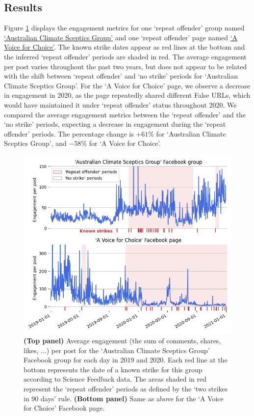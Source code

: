 \documentclass[review]{elsarticle}
\begin{document}
\subsection{Results}

Figure \ref{repeat_example_timeseries} displays the engagement metrics for one `repeat offender' group named \href{https://www.facebook.com/groups/108655705888371/}{`Australian Climate Sceptics Group'} and one `repeat offender' page named \href{https://www.facebook.com/avoiceforchoice/}{`A Voice for Choice'}.
The known strike dates appear as red lines at the bottom and the inferred ‘repeat offender’ periods are shaded in red.
The average engagement per post varies throughout the past two years, but does not appear to be related with the shift between `repeat offender' and `no strike' periods for `Australian Climate Sceptics Group'.
For the `A Voice for Choice' page, we observe a decrease in engagement in 2020, as the page repeatedly shared different False URLs, which would have maintained it under `repeat offender' status throughout 2020.
We compared the average engagement metrics between the `repeat offender' and the `no strike' periods, expecting a decrease in engagement during the `repeat offender' periods.
The percentage change is $+61\%$ for `Australian Climate Sceptics Group', and $-58\%$ for `A Voice for Choice'.

\begin{figure}[!h]
\centering
\includegraphics[scale=0.5]{./../figure/sf_examples_timeseries.png}
\caption{
\textbf{(Top panel)} Average engagement (the sum of comments, shares, likes, ...) per post for the `Australian Climate Sceptics Group' Facebook group for each day in 2019 and 2020.
Each red line at the bottom represents the date of a known strike for this group according to Science Feedback data. 
The areas shaded in red represent the `repeat offender' periods as defined by the ‘two strikes in 90 days’ rule.
\textbf{(Bottom panel)} Same as above for the `A Voice for Choice' Facebook page.
}
\label{repeat_example_timeseries}
\end{figure}
\end{document}
